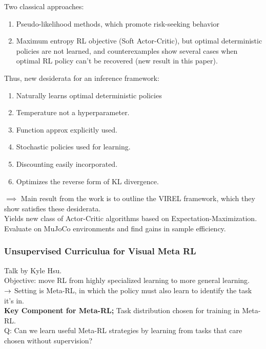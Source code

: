 Two classical approaches:
\begin{enumerate}
    \item Pseudo-likelihood methods, which promote risk-seeking behavior
    \item Maximum entropy RL objective (Soft Actor-Critic), but optimal deterministic policies are not learned, and counterexamples show several cases when optimal RL policy can't be recovered (new result in this paper).
\end{enumerate}

Thus, new desiderata for an inference framework:
\begin{enumerate}
    \item Naturally learns optimal deterministic policies
    \item Temperature not a hyperparameter.
    \item Function approx explicitly used.
    \item Stochastic policies used for learning.
    \item Discounting easily incorporated.
    \item Optimizes the reverse form of KL divergence.
\end{enumerate}

$\implies$ Main result from the work is to outline the VIREL framework, which they show satisfies these desiderata. \\

Yields new class of Actor-Critic algorithms based on Expectation-Maximization. Evaluate on MuJoCo environments and find gains in sample efficiency.

\subsubsection{Unsupervised Curriculua for Visual Meta RL \cite{jabri2019unsupervised}}
% 
Talk by Kyle Hsu. \\

Objective: move RL from highly specialized learning to more general learning. \\

$\rightarrow$ Setting is Meta-RL, in which the policy must also learn to identify the task it's in. \\

{\bf Key Component for Meta-RL;} Task distribution chosen for training in Meta-RL. \\

Q: Can we learn useful Meta-RL strategies by learning from tasks that care chosen without supervision?

